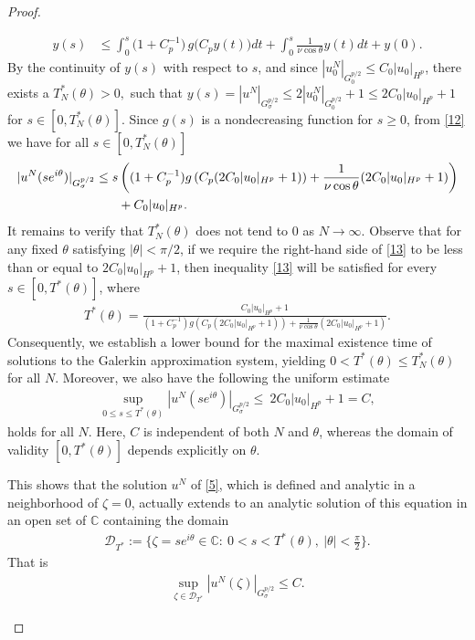 \documentclass[12pt]{article}
\theoremstyle{plain}
\theoremstyle{remark}
\newcommand{\C}{\mathbb{C}}
\newcommand{\Gspace}{G_\sigma^{p/2}}
\begin{document}
\begin{proof}
\begin{enumerate}
\begin{align}
    y(s) &\leq \int_0^s  \!\bigl(1 + C_p^{-1}\bigr)\,
    g \bigl(C_p y(t)\bigl) dt+ \int_0^s  \frac{1}{\nu \cos\theta} y(t)dt
    + y(0).\label{12}
\end{align}
By the continuity of $y(s)$ with respect to \(s\), and since
$|u_0^N|_{G_{0}^{p/2}} \leq C_{0} |u_0|_{H^p}$,  there exists a $T^*_N(\theta)>0,$ such that
$y(s)=|u^N|_{G_{\sigma}^{p/2}} \leq  2|u_0^N|_{G_{0}^{p/2}} + 1 \leq 2C_{0} |u_0|_{H^p} + 1$ for \(s \in [0, T^*_N(\theta)]\).
Since $g(s)$ is a nondecreasing function for $s \geq 0$,  from \eqref{12} we have for all \(s \in [0, T^*_N(\theta)]\)
\begin{align}
    |u^N(se^{i\theta})|_{G_{\sigma}^{p/2}} \leq s  &\left ((1 + C_p^{-1}) g \left( C_p( 2C_{0} |u_0|_{H^p} + 1 \right) )+   \frac{1}{\nu \cos\theta}(2C_{0} |u_0|_{H^p} + 1)  \right)\notag \\ &  + C_0|u_0|_{H^p}.\label{13}
\end{align}
It remains to verify that \( T_N^*(\theta) \) does not tend to 0 as \( N \to \infty \). Observe that for any fixed $\theta$ satisfying $|\theta|<\pi/2$, if we require the right-hand side of \eqref{13} to be less than or equal to 
\( 2C_0|u_0|_{H^p} + 1 \), then inequality \eqref{13} will be satisfied for every  \( s \in [0, T^*(\theta)] \), where
\begin{align}
    T^*(\theta) = \frac{C_0|u_0|_{H^p} + 1}{(1 + C_p^{-1}) g(C_p(2C_0|u_0|_{H^p} + 1)) +  \frac{1}{\nu \cos\theta}(2C_{0} |u_0|_{H^p} + 1)}.\label{14}
\end{align}
Consequently, we establish a lower bound for the maximal existence time of solutions to the Galerkin approximation system, yielding $0 < T^*(\theta) \leq T_N^*(\theta)$ for all $N$. Moreover, we also have the following the uniform estimate
\begin{align}
   \sup_{0 \leq s\leq T^*(\theta)} \left| u^N(se^{i\theta}) \right|_{G_{\sigma}^{p/2}} \leq\ 2C_{0} |u_0|_{H^p} + 1 = C, \label{15} 
\end{align}
holds for all $N$. Here, $C$ is independent of both $N$ and $\theta$, whereas the domain of validity $[0, T^*(\theta)]$ depends explicitly on $\theta$.

This shows that the solution \( u^N \) of \eqref{5}, which is defined and analytic in a neighborhood of $\zeta=0$, actually extends to an analytic solution of this equation in an open set of $\C$ containing the domain
\begin{align}
   \mathcal D_{T^*}:=\{\zeta=se^{i\theta}\in\mathbb C:\ 0<s<T^*(\theta),\ |\theta|<\tfrac{\pi}{2}\}.\label{16}
\end{align} 
That is 
\begin{align}
     \sup_{\zeta\in \mathcal D_{T^*}} \left| u^N(\zeta) \right|_{\Gspace} \leq  C. \label{17} 
\end{align}


\end{enumerate}
\end{proof}
\end{document}
